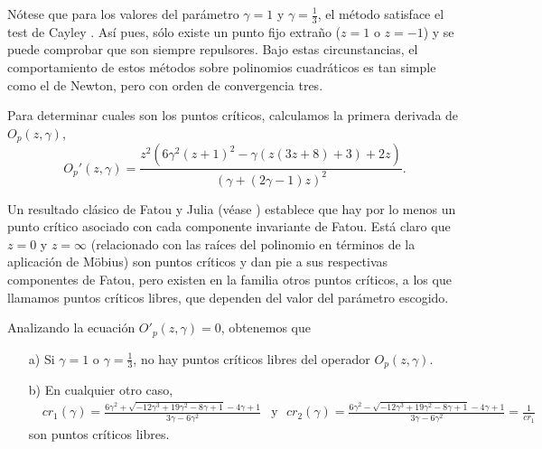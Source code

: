Nótese que para los valores del parámetro $\gamma=1$ y $\gamma=\frac{1}{3}$, el método satisface el test de Cayley \cite{BCT}. Así pues, sólo existe un punto fijo extraño ($z=1$ o $z=-1$) y se puede comprobar que son siempre repulsores. Bajo estas circunstancias, el comportamiento de estos métodos sobre polinomios cuadráticos es tan simple como el de Newton, pero con orden de convergencia tres.

Para determinar cuales son los puntos críticos, calculamos la primera derivada de $O_{p}\left( z,\gamma\right)$,
\[
O_{p}'\left( z,\gamma\right) =\frac{z^2 \left(6 \gamma ^2 (z+1)^2-\gamma  (z (3 z+8)+3)+2 z\right)}{(\gamma +(2 \gamma -1) z)^2}.
\]

Un resultado clásico de Fatou y Julia (véase \cite{devaney}) establece que hay por lo menos un punto crítico asociado con cada componente invariante de Fatou. Está claro que $z=0$ y $z=\infty$ (relacionado con las raíces del polinomio en términos de la aplicación de M\"{o}bius) son puntos críticos y dan pie a sus respectivas componentes de Fatou, pero existen en la familia otros puntos críticos, a los que llamamos puntos críticos libres, que dependen del valor del parámetro escogido.

\begin{lemma}
	Analizando la ecuación $O'_{p}(z,\gamma)=0$, obtenemos que
	\begin{itemize}
		\item[a)] Si $\gamma=1$ o $\gamma=\frac{1}{3}$, no hay puntos críticos libres del operador $O_{p}\left(
		z,\gamma\right)$.
		\item[b)] En cualquier otro caso,
		\begin{equation*}
		\begin{array}{ll}
		\ \ \ cr_1(\gamma)=\frac{6 \gamma ^2+\sqrt{-12 \gamma ^3+19 \gamma ^2-8 \gamma +1}-4 \gamma +1}{3 \gamma -6 \gamma ^2}  & \mbox{y} \ \ \ cr_2(\gamma)=\frac{6 \gamma ^2-\sqrt{-12 \gamma ^3+19 \gamma ^2-8 \gamma +1}-4 \gamma +1}{3 \gamma -6 \gamma ^2}=\frac{1}{cr_1}
		\end{array}
		\end{equation*}
		son puntos críticos libres.
	\end{itemize}
\end{lemma}

